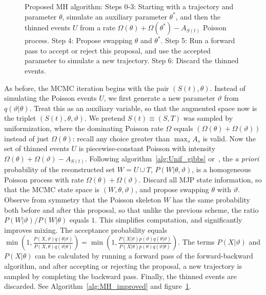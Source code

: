 \begin{figure}[h!]
\begin{minipage}[hp]{0.45\linewidth}
  \end{minipage}
    \caption{Proposed MH algorithm: Steps 0-3: Starting with a trajectory and parameter $\theta$,
      simulate an auxiliary parameter $\theta^*$, and then the thinned events
      $U$ from a rate $\Omega(\theta) + \Omega(\theta^*) - A_{S(t)}$ Poisson
      process. Step 4: Propose swapping $\theta$ and $\theta^*$. Step 5:
      Run a forward pass to accept or reject this proposal, and use the accepted
    parameter to simulate a new trajectory. Step 6: Discard the thinned events.} 
   \label{fig:MH_improved}
  \end{figure}
As before, the MCMC iteration begins with the pair $(S(t), \theta)$. 
Instead of simulating the Poisson events $U$, we first generate a new 
parameter $\vartheta$ from $q(\vartheta|\theta)$. Treat this as an 
auxiliary variable, so that the augmented space now is the triplet 
$(S(t), \theta,\vartheta)$. We pretend $S(t) \equiv (S,T)$ was sampled by  
uniformization, where the dominating Poisson rate $\Omega$ equals 
$(\Omega(\theta) + \Omega(\vartheta))$ instead of just $\Omega(\theta)$:
recall any choice greater than $\max_s A_s$ is valid.
Now the set of thinned events $U$ is piecewise-constant
Poisson with intensity $\Omega(\theta) + \Omega(\vartheta) - 
A_{S(t)}$. Following algorithm~\ref{alg:Unif_gibbs} or~\cite{RaoTeh13}, 
the {\em a priori} probability of the reconstructed set $W = U \cup T$, 
$P(W|\theta,\vartheta)$, is a homogeneous Poisson 
process with rate $\Omega(\theta) + \Omega(\vartheta)$. Discard all 
MJP state information, so that the MCMC state space is $(W, \theta, \vartheta)$,
and propose swapping $\theta$ with $\vartheta$. 
Observe from
symmetry that the Poisson skeleton $W$ has the same probability both
before and after this proposal, so that unlike the previous scheme,
the ratio $P(W|\vartheta)/P(W|\theta)$ equals $1$.  This simplifies 
computation, and significantly improves mixing.
The acceptance probability 
equals
$ 
  \min\left(1, \frac{P(X,\vartheta)q(\theta|\vartheta)}
   {P(X,\theta)q(\vartheta|\theta)}\right) = 
  \min\left(1, \frac{P(X|\vartheta)p(\vartheta)q(\theta|\vartheta)}
   {P(X|\theta)p(\theta)q(\vartheta|\theta)}\right).
   $
   The terms $P(X|\vartheta)$ and  $P(X|\theta)$ can be calculated by 
   running a forward pass of the forward-backward algorithm, and after
   accepting or rejecting the proposal, a new trajectory is sampled by
   completing the backward pass. Finally, the thinned events are
   discarded. See Algorithm~\ref{alg:MH_improved} and 
   figure~\ref{fig:MH_improved}. %

